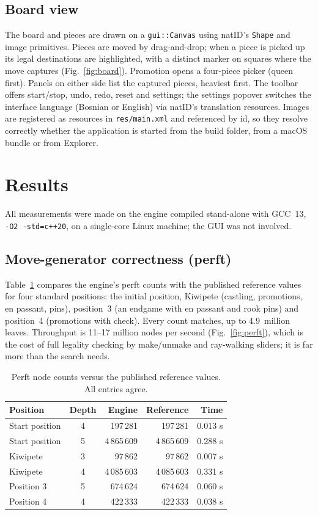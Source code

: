 \documentclass[conference]{IEEEtran}
\begin{document}
\subsection{Board view}
The board and pieces are drawn on a \texttt{gui::Canvas} using natID's \texttt{Shape} and image primitives. Pieces are moved by drag-and-drop; when a piece is picked up its legal destinations are highlighted, with a distinct marker on squares where the move captures (Fig.~\ref{fig:board}). Promotion opens a four-piece picker (queen first). Panels on either side list the captured pieces, heaviest first. The toolbar offers start/stop, undo, redo, reset and settings; the settings popover switches the interface language (Bosnian or English) via natID's translation resources. Images are registered as resources in \texttt{res/main.xml} and referenced by id, so they resolve correctly whether the application is started from the build folder, from a macOS bundle or from Explorer.

\section{Results}
\label{sec:results}
All measurements were made on the engine compiled stand-alone with GCC~13, \texttt{-O2 -std=c++20}, on a single-core Linux machine; the GUI was not involved.

\subsection{Move-generator correctness (perft)}
\label{sec:perft}
Table~\ref{tab:perft} compares the engine's perft counts with the published reference values \cite{cpw} for four standard positions: the initial position, Kiwipete (castling, promotions, en passant, pins), position~3 (an endgame with en passant and rook pins) and position~4 (promotions with check). Every count matches, up to 4.9~million leaves. Throughput is 11--17 million nodes per second (Fig.~\ref{fig:perft}), which is the cost of full legality checking by make/unmake and ray-walking sliders; it is far more than the search needs.

\begin{table}[t]
\caption{Perft node counts versus the published reference values. All entries agree.}
\label{tab:perft}
\centering
\begin{tabular}{@{}lcrrr@{}}
\toprule
Position & Depth & Engine & Reference & Time \\
\midrule
Start position & 4 & 197\,281 & 197\,281 & 0.013 s \\
Start position & 5 & 4\,865\,609 & 4\,865\,609 & 0.288 s \\
Kiwipete & 3 & 97\,862 & 97\,862 & 0.007 s \\
Kiwipete & 4 & 4\,085\,603 & 4\,085\,603 & 0.331 s \\
Position 3 & 5 & 674\,624 & 674\,624 & 0.060 s \\
Position 4 & 4 & 422\,333 & 422\,333 & 0.038 s \\
\bottomrule
\end{tabular}
\end{table}
\end{document}
